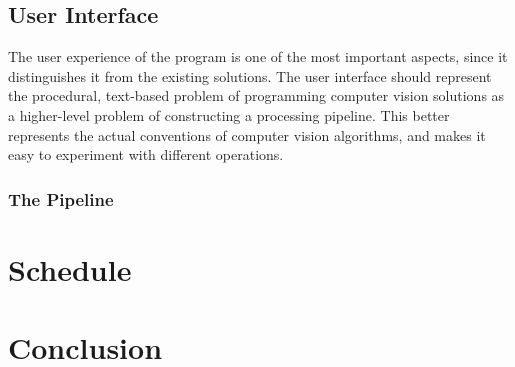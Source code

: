 \documentclass[12pt]{article}
\begin{document}
\subsection{User Interface}
The user experience of the program is one of the most important aspects, since
it distinguishes it from the existing solutions.  The user interface should
represent the procedural, text-based problem of programming computer vision
solutions as a higher-level problem of constructing a processing pipeline.
This better represents the actual conventions of computer vision algorithms,
and makes it easy to experiment with different operations.

\subsubsection{The Pipeline}





\section{Schedule}


\section{Conclusion}


\newpage


\end{document}
